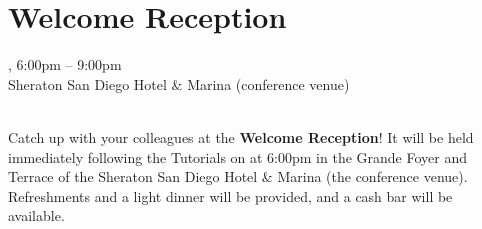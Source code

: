 \clearpage
\section[Welcome Reception]{Welcome Reception}
\setheaders{}{\daydateyear}

\begin{center}


\daydateyear, 6:00pm -- 9:00pm \vspace{1em}\\
Sheraton San Diego Hotel \& Marina (conference venue)\\
\WelcomeReceptionLoc\\
\end{center}

\noindent Catch up with your colleagues at the \textbf{Welcome
Reception}! It will be held immediately following the Tutorials
on \daydate at 6:00pm in the Grande Foyer and Terrace of the Sheraton
San Diego Hotel \& Marina (the conference venue).  Refreshments and a
light dinner will be provided, and a cash bar will be available.

